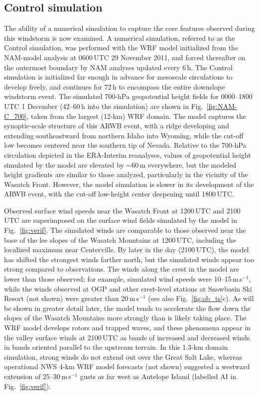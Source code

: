 \documentclass[pdftex,12pt]{article}
\def\mps{m\,s$^{-1}$}
\def\around{$\sim$}
\begin{document}
\subsection{Control simulation}
The ability of a numerical simulation to capture the core features observed during this windstorm is now examined. A numerical simulation, referred to as the Control simulation, was performed with the WRF model initialized from the NAM-model analysis at 0600\,UTC 29 November 2011, and forced thereafter on the outermost boundary by NAM analyses updated every 6\,h.  The Control simulation is initialized far enough in advance for mesoscale circulations to develop freely, and continues for 72\,h to encompass the entire downslope windstorm event. The simulated 700-hPa geopotential height fields for 0000--1800\,UTC 1 December (42--60\,h into the simulation) are shown in Fig.~\ref{fig:NAM-C_700}, taken from the largest (12-km) WRF domain. The model captures the synoptic-scale structure of this ARWB event, with a ridge developing and extending southeastward from northern Idaho into Wyoming, while the cut-off low becomes centered near the southern tip of Nevada. Relative to the 700-hPa circulation depicted in the ERA-Interim reanalyses, values of geopotential height simulated by the model are elevated by \around 60\,m everywhere, but the modeled height gradients are similar to those analyzed, particularly in the vicinity of the Wasatch Front. However, the model simulation is slower in its development of the ARWB event, with the cut-off low-height center deepening until 1800\,UTC.

Observed surface wind speeds near the Wasatch Front at 1200\,UTC and 2100\,UTC are superimposed on the surface wind fields simulated by the model in Fig.~\ref{fig:verif}. The simulated winds are comparable to those observed near the base of the lee slopes of the Wasatch Mountains at 1200\,UTC, including the localized maximum near Centerville. By later in the day (2100\,UTC), the model has shifted the strongest winds farther north, but the simulated winds appear too strong compared to observations. The winds along the crest in the model are lower than those observed; for example, simulated wind speeds were 10--15\,\mps, while the winds observed at OGP and other crest-level stations at Snowbasin Ski Resort (not shown) were greater than 20\,\mps{} (see also Fig.~\ref{fig:ob_ts}c). As will be shown in greater detail later, the model tends to accelerate the flow down the slopes of the Wasatch Mountains more strongly than is likely taking place. The WRF model develops rotors and trapped waves, and these phenomena appear in the valley surface winds at 2100\,UTC as bands of increased and decreased winds in bands oriented parallel to the upstream terrain. In this 1.3-km domain simulation, strong winds do not extend out over the Great Salt Lake, whereas operational NWS 4-km WRF model forecasts (not shown) suggested a westward extension of 25--30\,\mps{} gusts as far west as Antelope Island (labelled AI in Fig.~\ref{fig:verif}).
\end{document}
